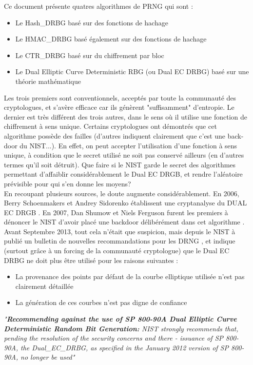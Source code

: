 	Ce document présente quatres algorithmes de PRNG qui sont :
	\begin{itemize}
		\item Le Hash\_DRBG basé sur des fonctions de hachage
		\item Le HMAC\_DRBG basé également sur des fonctions de hachage
		\item Le CTR\_DRBG basé sur du chiffrement par bloc
		\item Le Dual Elliptic Curve Deterministic RBG (ou Dual EC DRBG) basé sur une théorie mathématique\\
	\end{itemize}

	Les trois premiers sont conventionnels, acceptés par toute la communauté des cryptologues, et s'avère efficace car ils génèrent "suffisamment" d'entropie. 	Le dernier est très différent des trois autres, dans le sens où il utilise une fonction de chiffrement à sens unique. Certains cryptologues ont démontrés que cet algorithme possède des failles (d'autres indiquent clairement que c'est une back-door du NIST...). En effet, on peut accepter l'utilisation d'une fonction à sens unique, à condition que le secret utilisé ne soit pas conservé ailleurs (en d'autres termes qu'il soit détruit). 	Que faire si le NIST garde le secret des algorithmes permettant d'affaiblir considérablement le Dual EC DRGB, et rendre l'aléatoire prévisible pour qui s'en donne les moyens?\\

	En recoupant plusieurs sources, le doute augmente considérablement.	En 2006, Berry Schoenmakers et Andrey Sidorenko établissent une cryptanalyse du DUAL EC DRGB \cite{dualecrbg2006berry}.	 En 2007, Dan Shumow et Niels Ferguson furent les premiers à dénoncer le NIST d'avoir placé une backdoor délibérément dans cet algorithme \cite{shumow2007nist}.\\
	
	Avant Septembre 2013, tout cela n'était que suspicion, mais depuis le NIST à publié un bulletin de nouvelles recommandations pour les DRNG \cite{newRecomendingNist}, et indique (surtout grâce à un forcing de la communauté cryptologue) que le Dual EC DRBG ne doit plus être utilisé pour les raisons suivantes :
	\begin{itemize}
		\item La provenance des points par défaut de la courbe elliptique utilisée n'est pas clairement détaillée
		\item La génération de ces courbes n'est pas digne de confiance\\
	\end{itemize}
	\textit{"\textbf{Recommending against the use of SP 800-90A Dual Elliptic Curve Deterministic Random Bit Generation:} NIST strongly recommends that, pending the resolution of the security concerns and there - issuance of SP 800-90A, the Dual\_EC\_DRBG, as specified in the January 2012 version of SP 800-90A, no longer be used"}\\

